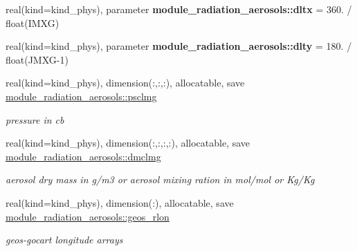 \begin{DoxyCompactItemize}
\mbox{\label{group__module__radiation__aerosols_ga084315fde4afcad23cd3aeb18a4d8a4e}} 
real(kind=kind\+\_\+phys), parameter {\bfseries module\+\_\+radiation\+\_\+aerosols\+::dltx} = 360. / float(I\+M\+XG)
\item 
\mbox{\label{group__module__radiation__aerosols_ga499bb3c75e9802c5ee7fd6cdb6660f7e}} 
real(kind=kind\+\_\+phys), parameter {\bfseries module\+\_\+radiation\+\_\+aerosols\+::dlty} = 180. / float(J\+M\+XG-\/1)
\item 
\mbox{\label{group__module__radiation__aerosols_ga942aa3a9f61cb40592bd0879a91c2ede}} 
real(kind=kind\+\_\+phys), dimension(\+:,\+:,\+:), allocatable, save \hyperlink{group__module__radiation__aerosols_ga942aa3a9f61cb40592bd0879a91c2ede}{module\+\_\+radiation\+\_\+aerosols\+::psclmg}
\begin{DoxyCompactList}\small\item\em pressure in cb \end{DoxyCompactList}\item 
\mbox{\label{group__module__radiation__aerosols_ga123d552c7f98f7371565f4e2017efd45}} 
real(kind=kind\+\_\+phys), dimension(\+:,\+:,\+:,\+:), allocatable, save \hyperlink{group__module__radiation__aerosols_ga123d552c7f98f7371565f4e2017efd45}{module\+\_\+radiation\+\_\+aerosols\+::dmclmg}
\begin{DoxyCompactList}\small\item\em aerosol dry mass in g/m3 or aerosol mixing ration in mol/mol or Kg/\+Kg \end{DoxyCompactList}\item 
\mbox{\label{group__module__radiation__aerosols_ga1a0e35ab33517e765898870b8b1ab1ad}} 
real(kind=kind\+\_\+phys), dimension(\+:), allocatable, save \hyperlink{group__module__radiation__aerosols_ga1a0e35ab33517e765898870b8b1ab1ad}{module\+\_\+radiation\+\_\+aerosols\+::geos\+\_\+rlon}
\begin{DoxyCompactList}\small\item\em geos-\/gocart longitude arrays \end{DoxyCompactList}\item 
\mbox{\label{group__module__radiation__aerosols_gaef43bfbd28ef9b87e8d6973ba7331a18}} 

\end{DoxyCompactItemize}
